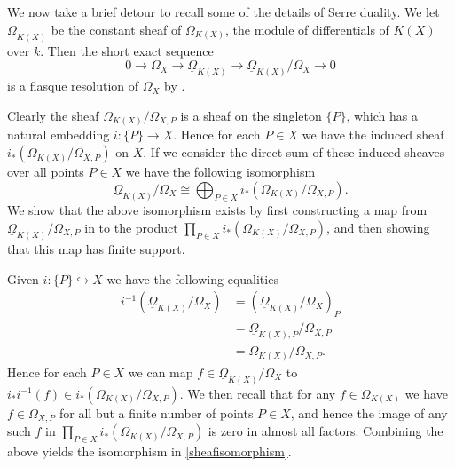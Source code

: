\documentclass[draft, 11pt]{article} %
\theoremstyle{plain}
\theoremstyle{remark}
\begin{document}
We now take a brief detour to recall some of the details of Serre duality.
We let $\underline{\Omega}_{K(X)}$ be the constant sheaf of $\Omega_{K(X)}$, the module of differentials of $K(X)$ over $k$.
Then the short exact sequence
\begin{equation}\label{serredualityses}
0 \rightarrow \Omega_X \rightarrow \underline{\Omega}_{K(X)} \rightarrow \underline{\Omega}_{K(X)}/\Omega_X \rightarrow 0
\end{equation}
is a flasque resolution of $\Omega_X$ by \cite[Chap II, ex. 1.16]{hart}.

Clearly the sheaf $\Omega_{K(X)}/\Omega_{X,P}$ is a sheaf on the singleton $\{P\}$, which has a natural embedding $i\colon \{P\} \rightarrow X$.
Hence for each $P\in X$ we have the induced sheaf $i_*\left(\Omega_{K(X)}/\Omega_{X,P}\right)$ on $X$.
If we consider the direct sum of these induced sheaves over all points $P\in X$ we have the following isomorphism
\begin{equation}\label{sheafisomorphism}
\underline{\Omega}_{K(X)}/\Omega_X\cong \bigoplus_{P\in X} i_*\left(\Omega_{K(X)}/\Omega_{X,P}\right).
\end{equation}
We show that the above isomorphism exists by first constructing a map from $\underline{\Omega}_{K(X)}/\Omega_{X,P}$ in to the product $\prod_{P \in X} i_*\left(\Omega_{K(X)}/\Omega_{X,P}\right)$, and then showing that this map has finite support.

Given $i\colon \{P\} \hookrightarrow X$ we have the following equalities
\begin{align*}
i^{-1}\left(\underline{\Omega}_{K(X)}/\Omega_X\right) & = \left(\underline{\Omega}_{K(X)}/\Omega_X\right)_P \\
& = \underline{\Omega}_{K(X),P}/\Omega_{X,P} \\
& = \Omega_{K(X)}/\Omega_{X,P}.
\end{align*}
Hence for each $P\in X$ we can map $f \in \underline{\Omega}_{K(X)}/\Omega_X$ to $i_*i^{-1}(f) \in i_*\left( \Omega_{K(X)}/\Omega_{X,P}\right)$.
We then recall that for any $f \in \Omega_{K(X)}$ we have $f \in \Omega_{X,P}$  for all but a finite number of points $P \in X$, and hence the image of any such $f$ in $\prod_{P\in X} i_*\left( \Omega_{K(X)}/\Omega_{X,P}\right)$ is zero in almost all factors.
Combining the above yields the isomorphism in \eqref{sheafisomorphism}.
\end{document}
